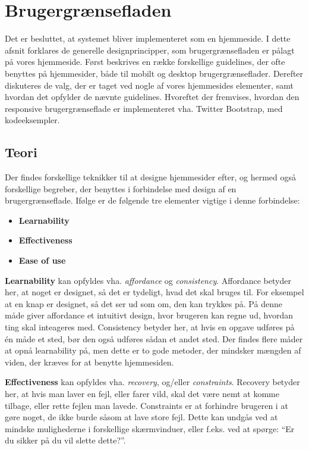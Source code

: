 \section{Brugergrænsefladen} \label{brugergraenseflade}
Det er besluttet, at systemet bliver implementeret som en hjemmeside.
I dette afsnit forklares de generelle designprincipper, som brugergrænsefladen er pålagt på vores hjemmeside.
Først beskrives en række forskellige guidelines, der ofte benyttes på hjemmesider, både til mobilt og desktop brugergrænseflader.
Derefter diskuteres de valg, der er taget ved nogle af vores hjemmesides elementer, samt hvordan det opfylder de nævnte guidelines.
Hvoreftet der fremvises, hvordan den responsive brugergrænseflade er implementeret vha. Twitter Bootstrap, med kodeeksempler. 

\subsection{Teori}
Der findes forskellige teknikker til at designe hjemmesider efter, og hermed også forskellige begreber, der benyttes i forbindelse med design af en brugergrænseflade.
Ifølge \citep{DIS2014} er de følgende tre elementer vigtige i denne forbindelse:
\begin{itemize}[nolistsep,noitemsep]
	\item \textbf{Learnability}
	\item \textbf{Effectiveness}
	\item \textbf{Ease of use}
\end{itemize}

\textbf{Learnability} kan opfyldes vha. \textit{affordance} og \textit{consistency}.
Affordance betyder her, at noget er designet, så det er tydeligt, hvad det skal bruges til.
For eksempel at en knap er designet, så det ser ud som om, den kan trykkes på. 
På denne måde giver affordance et intuitivt design, hvor brugeren kan regne ud, hvordan ting skal inteageres med.
Consistency betyder her, at hvis en opgave udføres på én måde et sted, bør den også udføres sådan et andet sted.
Der findes flere måder at opnå learnability på, men dette er to gode metoder, der mindsker mængden af viden, der kræves for at benytte hjemmesiden.

\textbf{Effectiveness} kan opfyldes vha. \textit{recovery}, og/eller \textit{constraints}.
Recovery betyder her, at hvis man laver en fejl, eller farer vild, skal det være nemt at komme tilbage, eller rette fejlen man lavede.
Constraints er at forhindre brugeren i at gøre noget, de ikke burde såsom at lave store fejl. 
Dette kan undgås ved at mindske mulighederne i forskellige skærmvinduer, eller f.eks. ved at spørge: ``Er du sikker på du vil slette dette?''.

